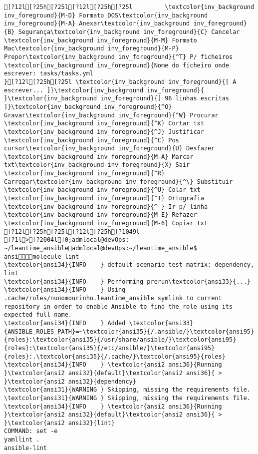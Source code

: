 \documentclass{scrartcl}
\begin{document}
\begin{Verbatim}
[?12l[?25h[?25l[?12l[?25h[?25l         \textcolor{inv_background inv_foreground}{M-D} Formato DOS\textcolor{inv_background inv_foreground}{M-A} Anexar\textcolor{inv_background inv_foreground}{B} Segurança\textcolor{inv_background inv_foreground}{C} Cancelar           \textcolor{inv_background inv_foreground}{M-M} Formato Mac\textcolor{inv_background inv_foreground}{M-P} Prepor\textcolor{inv_background inv_foreground}{^T} P/ ficheiros
\textcolor{inv_background inv_foreground}{Nome do ficheiro onde escrever: tasks/tasks.yml                                                                                           }[?12l[?25h[?25l \textcolor{inv_background inv_foreground}{[ A escrever... ]}\textcolor{inv_background inv_foreground}{          }\textcolor{inv_background inv_foreground}{[ 96 linhas escritas ]}\textcolor{inv_background inv_foreground}{^O} Gravar\textcolor{inv_background inv_foreground}{^W} Procurar      \textcolor{inv_background inv_foreground}{^K} Cortar txt    \textcolor{inv_background inv_foreground}{^J} Justificar    \textcolor{inv_background inv_foreground}{^C} Pos cursor\textcolor{inv_background inv_foreground}{U} Desfazer     \textcolor{inv_background inv_foreground}{M-A} Marcar txt\textcolor{inv_background inv_foreground}{X} Sair    \textcolor{inv_background inv_foreground}{^R} Carregar\textcolor{inv_background inv_foreground}{^\} Substituir    \textcolor{inv_background inv_foreground}{^U} Colar txt     \textcolor{inv_background inv_foreground}{^T} Ortografia    \textcolor{inv_background inv_foreground}{^_} Ir p/ linha   \textcolor{inv_background inv_foreground}{M-E} Refazer      \textcolor{inv_background inv_foreground}{M-6} Copiar txt
[?12l[?25h[?25l[?12l[?25h[?1049l
[?1l>[?2004l]0;admlocal@devOps: ~/leantime_ansibleadmlocal@devOps:~/leantime_ansible$ ansimolecule lint
\textcolor{ansi34}{INFO    } default scenario test matrix: dependency, lint
\textcolor{ansi34}{INFO    } Performing prerun\textcolor{ansi33}{...}
\textcolor{ansi34}{INFO    } Using .cache/roles/nunomourinho.leantime_ansible symlink to current repository in order to enable Ansible to find the role using its expected full name.
\textcolor{ansi34}{INFO    } Added \textcolor{ansi33}{ANSIBLE_ROLES_PATH}=~\textcolor{ansi35}{/.ansible/}\textcolor{ansi95}{roles}:\textcolor{ansi35}{/usr/share/ansible/}\textcolor{ansi95}{roles}:\textcolor{ansi35}{/etc/ansible/}\textcolor{ansi95}{roles}:.\textcolor{ansi35}{/.cache/}\textcolor{ansi95}{roles}
\textcolor{ansi34}{INFO    } \textcolor{ansi2 ansi36}{Running }\textcolor{ansi2 ansi32}{default}\textcolor{ansi2 ansi36}{ > }\textcolor{ansi2 ansi32}{dependency}
\textcolor{ansi31}{WARNING } Skipping, missing the requirements file.
\textcolor{ansi31}{WARNING } Skipping, missing the requirements file.
\textcolor{ansi34}{INFO    } \textcolor{ansi2 ansi36}{Running }\textcolor{ansi2 ansi32}{default}\textcolor{ansi2 ansi36}{ > }\textcolor{ansi2 ansi32}{lint}
COMMAND: set -e
yamllint .
ansible-lint


\end{Verbatim}
\end{document}
